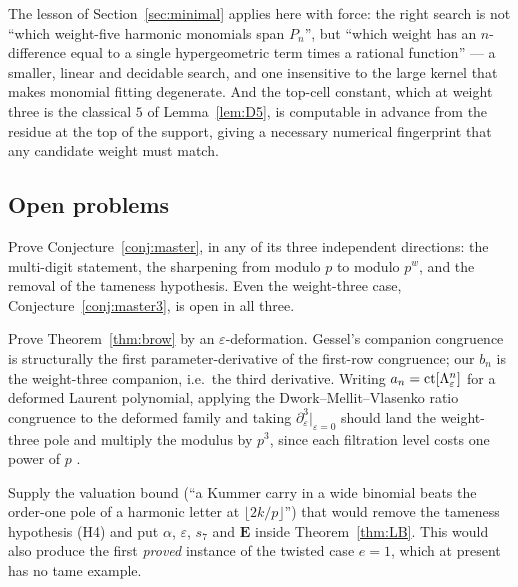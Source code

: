 The lesson of Section~\ref{sec:minimal} applies here with force: the right search is not
``which weight-five harmonic monomials span $P_n$'', but ``which weight has an
$n$-difference equal to a single hypergeometric term times a rational function'' --- a
smaller, linear and decidable search, and one insensitive to the large kernel that makes
monomial fitting degenerate. And the top-cell constant, which at weight three is the
classical $5$ of Lemma~\ref{lem:D5}, is computable in advance from the residue at the top
of the support, giving a necessary numerical fingerprint that any candidate weight must
match.

\subsection{Open problems}
\label{ssec:open}

\begin{problem}\label{prob:master}
Prove Conjecture~\ref{conj:master}, in any of its three independent directions: the
multi-digit statement, the sharpening from modulo $p$ to modulo $p^w$, and the removal of
the tameness hypothesis. Even the weight-three case, Conjecture~\ref{conj:master3}, is
open in all three.
\end{problem}

\begin{problem}\label{prob:eps}
Prove Theorem~\ref{thm:brow} by an $\varepsilon$-deformation. Gessel's companion
congruence \cite[Thm.~1.4]{Beukers2211} is structurally the first parameter-derivative of
the first-row congruence; our $b_n$ is the weight-three companion, i.e.\ the third
derivative. Writing $a_n=\operatorname{ct}[\Lambda_\varepsilon^n]$ for a deformed Laurent polynomial,
applying the Dwork--Mellit--Vlasenko ratio congruence \cite{MellitVlasenko} to the
deformed family and taking $\partial_\varepsilon^3|_{\varepsilon=0}$ should land the
weight-three pole and multiply the modulus by $p^3$, since each filtration level costs one
power of $p$ \cite[Prop.~7.7]{BVthree}.
\end{problem}

\begin{problem}\label{prob:lemmaD}
Supply the valuation bound (``a Kummer carry in a wide binomial beats the order-one pole
of a harmonic letter at $\lfloor2k/p\rfloor$'') that would remove the tameness hypothesis
(H4) and put $\alpha$, $\varepsilon$, $s_7$ and $\mathbf E$ inside Theorem~\ref{thm:LB}.
This would also produce the first \emph{proved} instance of the twisted case $e=1$, which
at present has no tame example.
\end{problem}

